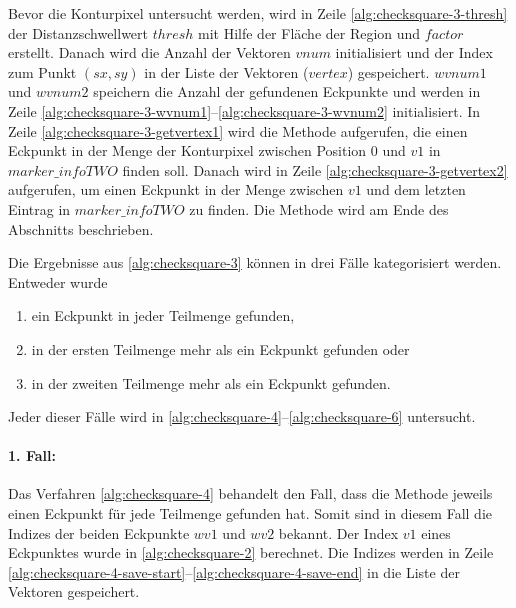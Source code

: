 

Bevor die Konturpixel untersucht werden, wird in Zeile \ref{alg:checksquare-3-thresh} der Distanzschwellwert
 $\mathit{thresh}$ mit Hilfe der Fläche der Region und $\mathit{factor}$ erstellt. Danach wird die Anzahl der Vektoren
 $\mathit{vnum}$ initialisiert und der Index zum Punkt $(\mathit{sx}, \mathit{sy})$ in der Liste der Vektoren
 ($\mathit{vertex}$) gespeichert. $wvnum1$ und $wvnum2$ speichern die Anzahl der gefundenen Eckpunkte und werden in
 Zeile \ref{alg:checksquare-3-wvnum1}--\ref{alg:checksquare-3-wvnum2} initialisiert. In Zeile
 \ref{alg:checksquare-3-getvertex1} wird die Methode  aufgerufen, die einen Eckpunkt in der Menge
 der Konturpixel zwischen Position $0$ und $\mathit{v1}$ in $\mathit{marker\_infoTWO}$ finden soll. Danach wird
  in Zeile \ref{alg:checksquare-3-getvertex2} aufgerufen, um einen Eckpunkt in der Menge zwischen
 $\mathit{v1}$ und dem letzten Eintrag in $\mathit{marker\_infoTWO}$ zu finden. Die Methode  wird
 am Ende des Abschnitts beschrieben.

Die Ergebnisse aus \autoref{alg:checksquare-3} können in drei Fälle kategorisiert werden. Entweder wurde

\begin{enumerate}
	\item ein Eckpunkt in jeder Teilmenge gefunden, \label{enum:checksquare-case1}
	\item in der ersten Teilmenge mehr als ein Eckpunkt gefunden oder \label{enum:checksquare-case2}
	\item in der zweiten Teilmenge mehr als ein Eckpunkt gefunden. \label{enum:checksquare-case3}
\end{enumerate}

Jeder dieser Fälle wird in \autoref{alg:checksquare-4}--\autoref{alg:checksquare-6} untersucht.

\paragraph{1. Fall:} %
\label{par:1_fall}

Das Verfahren \autoref{alg:checksquare-4} behandelt den Fall, dass die Methode  jeweils einen
 Eckpunkt für jede Teilmenge gefunden hat. Somit sind in diesem Fall die Indizes der beiden Eckpunkte $\mathit{wv1}$
 und $\mathit{wv2}$ bekannt. Der Index $\mathit{v1}$ eines Eckpunktes wurde in \autoref{alg:checksquare-2} berechnet.
 Die Indizes werden in Zeile \ref{alg:checksquare-4-save-start}--\ref{alg:checksquare-4-save-end} in die Liste der
 Vektoren gespeichert.

